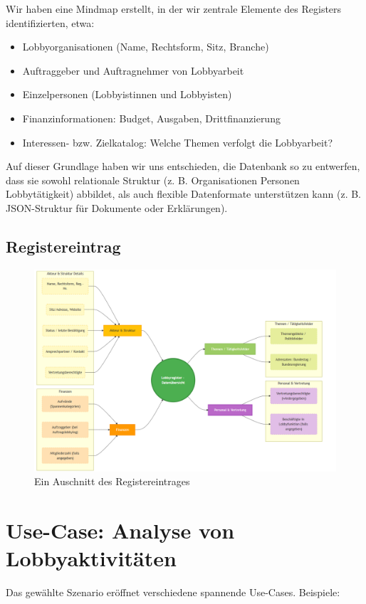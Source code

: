 \documentclass[12pt,twoside=false,a4paper,parskip]{scrbook}
\begin{document}
Wir haben eine Mindmap erstellt, in der wir zentrale Elemente des Registers identifizierten, etwa:

\begin{itemize}
\item Lobbyorganisationen (Name, Rechtsform, Sitz, Branche)
\item Auftraggeber und Auftragnehmer von Lobbyarbeit
\item Einzelpersonen (Lobbyistinnen und Lobbyisten)

\item Finanzinformationen: Budget, Ausgaben, Drittfinanzierung
\item Interessen- bzw. Zielkatalog: Welche Themen verfolgt die Lobbyarbeit?
\end{itemize}

Auf dieser Grundlage haben wir uns entschieden, die Datenbank so zu entwerfen, dass sie sowohl relationale Struktur (z. B. Organisationen Personen Lobbytätigkeit) abbildet, als auch flexible Datenformate unterstützen kann (z. B. JSON-Struktur für Dokumente oder Erklärungen).
\section*{Registereintrag}


\begin{figure}[h]
\centering
\includegraphics[width=1\textwidth]{overview.png} %
\caption{Ein Auschnitt des Registereintrages}
\label{fig:example}
\end{figure}


\newpage


\chapter{Use-Case: Analyse von Lobbyaktivitäten}
Das gewählte Szenario eröffnet verschiedene spannende Use-Cases. Beispiele:
\end{document}
